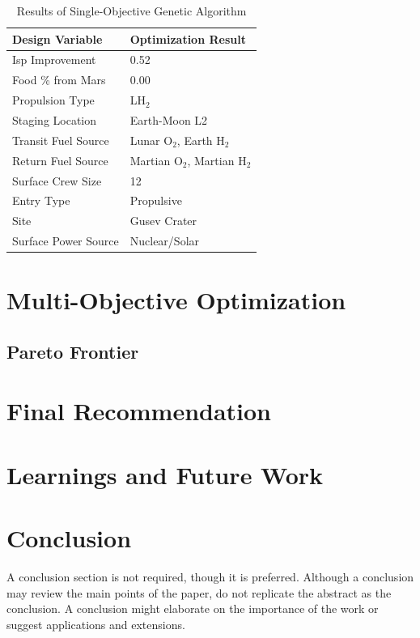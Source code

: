 \documentclass[]{aiaa-pretty}
\begin{document}
\begin{table}[h!]
	\centering
	\caption{Results of Single-Objective Genetic Algorithm}
	\label{tab:GAsingle}
	\begin{tabular}{ll}
	\textbf{Design Variable} & \textbf{Optimization Result}\\ \hline
	Isp Improvement & 0.52 \\
	Food \% from Mars & 0.00 \\
	Propulsion Type & LH$_2$ \\
	Staging Location & Earth-Moon L2 \\
	Transit Fuel Source & Lunar O$_2$, Earth H$_2$ \\
	Return Fuel Source & Martian O$_2$, Martian H$_2$ \\
	Surface Crew Size & 12\\
	Entry Type & Propulsive \\
	Site & Gusev Crater \\
	Surface Power Source & Nuclear/Solar\\
	\end{tabular}
\end{table}


\section{Multi-Objective Optimization}
\label{sec:multi}

\subsection{Pareto Frontier}


\section{Final Recommendation}


\section{Learnings and Future Work} 

\section{Conclusion}
A conclusion section is not required, though it is preferred. Although a conclusion may review the main points of the paper, do not replicate the abstract as the conclusion. A conclusion might elaborate on the importance of the work or suggest applications and extensions. 
\end{document}
